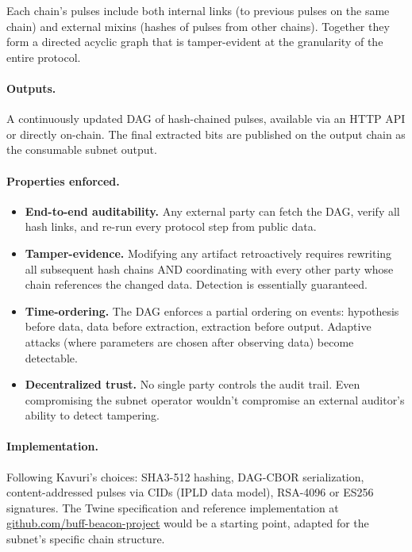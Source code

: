 \documentclass[11pt]{article}
\begin{document}
Each chain's pulses include both internal links (to previous pulses on the same chain) and external mixins (hashes of pulses from other chains). Together they form a directed acyclic graph that is tamper-evident at the granularity of the entire protocol.

\paragraph{Outputs.} A continuously updated DAG of hash-chained pulses, available via an HTTP API or directly on-chain. The final extracted bits are published on the output chain as the consumable subnet output.

\paragraph{Properties enforced.}
\begin{itemize}
    \item \textbf{End-to-end auditability.} Any external party can fetch the DAG, verify all hash links, and re-run every protocol step from public data.
    \item \textbf{Tamper-evidence.} Modifying any artifact retroactively requires rewriting all subsequent hash chains AND coordinating with every other party whose chain references the changed data. Detection is essentially guaranteed.
    \item \textbf{Time-ordering.} The DAG enforces a partial ordering on events: hypothesis before data, data before extraction, extraction before output. Adaptive attacks (where parameters are chosen after observing data) become detectable.
    \item \textbf{Decentralized trust.} No single party controls the audit trail. Even compromising the subnet operator wouldn't compromise an external auditor's ability to detect tampering.
\end{itemize}

\paragraph{Implementation.} Following Kavuri's choices: SHA3-512 hashing, DAG-CBOR serialization, content-addressed pulses via CIDs (IPLD data model), RSA-4096 or ES256 signatures. The Twine specification and reference implementation at \href{https://github.com/buff-beacon-project}{github.com/buff-beacon-project} would be a starting point, adapted for the subnet's specific chain structure.
\end{document}
